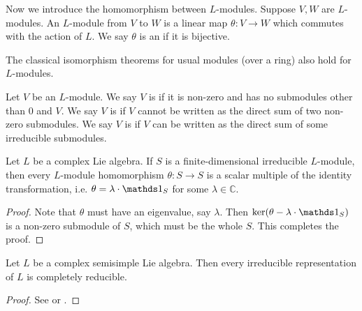 Now we introduce the homomorphism between $L$-modules. Suppose $V,W$ are $L$-modules. An $L$-module  from $V$ to $W$ is a linear map $\theta:V\to W$ which commutes with the action of $L$. We say $\theta$ is an  if it is bijective.

The classical isomorphism theorems for usual modules (over a ring) also hold for $L$-modules.

Let $V$ be an $L$-module. We say $V$ is  if it is non-zero and has no submodules other than 0 and $V$. We say $V$ is  if $V$ cannot be written as the direct sum of two non-zero submodules. We say $V$ is  if $V$ can be written as the direct sum of some irreducible submodules.

\begin{lem}
    Let $L$ be a complex Lie algebra. If $S$ is a finite-dimensional irreducible $L$-module, then every $L$-module homomorphism $\theta:S\to S$ is a scalar multiple of the identity transformation, i.e. $\theta=\lambda\cdot\id_S$ for some $\lambda\in\mathbb{C}$.
\end{lem}

\begin{proof}
    Note that $\theta$ must have an eigenvalue, say $\lambda$. Then $\ker (\theta-\lambda\cdot\id_S)$ is a non-zero submodule of $S$, which must be the whole $S$. This completes the proof.
\end{proof}

\begin{thm}\label{weyl's_thm}
    Let $L$ be a complex semisimple Lie algebra. Then every irreducible representation of $L$ is completely reducible.
\end{thm}

\begin{proof}
    See \cite[Appendix B]{Intro_to_Lie_alg} or \cite[p. 28]{Humphreys_Lie_alg}.
\end{proof}














